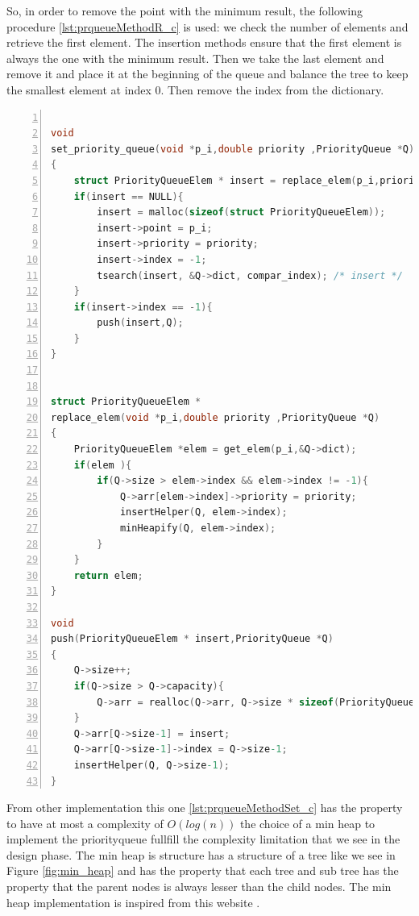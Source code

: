 So, in order to remove the point with the minimum result, the following procedure \ref{lst:prqueueMethodR_c} is used: we check the number of elements and retrieve the first element. The insertion methods ensure that the first element is always the one with the minimum result. Then we take the last element and remove it and place it at the beginning of the queue and balance the tree to keep the smallest element at index 0. Then remove the index from the dictionary. 


\begin{minipage}{\linewidth}
\begin{lstlisting}[language=C, % Spécifie le langage du code
caption={PriorityQueue Set Elem}, % Légende du listing
label=lst:prqueueMethodSet_c, % Étiquette pour référencer le listing
numbers=left,
numberstyle=\tiny\color{gray},
stepnumber=1,
frame=single,
breaklines=true,
postbreak=\mbox{\textcolor{red}{$\hookrightarrow$}\space},
showstringspaces=false
]

void
set_priority_queue(void *p_i,double priority ,PriorityQueue *Q)
{
	struct PriorityQueueElem * insert = replace_elem(p_i,priority,Q);
	if(insert == NULL){
		insert = malloc(sizeof(struct PriorityQueueElem));
		insert->point = p_i;
		insert->priority = priority;
		insert->index = -1;
		tsearch(insert, &Q->dict, compar_index); /* insert */
	}
	if(insert->index == -1){
		push(insert,Q);
	}
}


struct PriorityQueueElem *
replace_elem(void *p_i,double priority ,PriorityQueue *Q)
{
	PriorityQueueElem *elem = get_elem(p_i,&Q->dict);
	if(elem ){
		if(Q->size > elem->index && elem->index != -1){
			Q->arr[elem->index]->priority = priority;
			insertHelper(Q, elem->index);
			minHeapify(Q, elem->index);
		}
	}
	return elem;
}
	
void
push(PriorityQueueElem * insert,PriorityQueue *Q)
{
	Q->size++;
	if(Q->size > Q->capacity){
		Q->arr = realloc(Q->arr, Q->size * sizeof(PriorityQueueElem*));
	}
	Q->arr[Q->size-1] = insert;
	Q->arr[Q->size-1]->index = Q->size-1;
	insertHelper(Q, Q->size-1);
}

\end{lstlisting}
\end{minipage}

From other implementation this one \ref{lst:prqueueMethodSet_c} has the property to have at most a complexity of $O(log(n))$ the choice of a min heap to implement the priorityqueue fullfill the complexity limitation that we see in the design phase. The min heap is structure has a structure of a tree like we see in Figure \ref{fig:min_heap} and has the property that each tree and sub tree has the property that the parent nodes is always lesser than the child nodes. The min heap implementation is inspired from this website \cite{GfG_2023}. 


